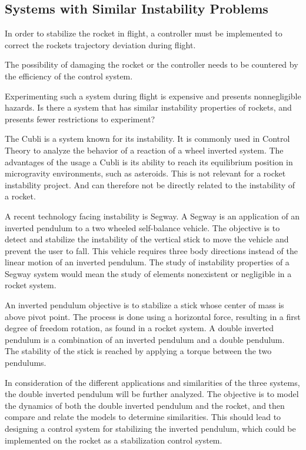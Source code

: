 \subsection{Systems with Similar Instability Problems}
\graphicspath{{figures/"Preanalysis&Requirement"/SimilarSystems/}}

In order to stabilize the rocket in flight, a controller must be implemented to correct the rockets trajectory deviation during flight.

The possibility of damaging the rocket or the controller needs to be countered by the efficiency of the control system.


Experimenting such a system during flight is expensive and presents nonnegligible hazards.
Is there a system that has similar instability properties of rockets, and presents fewer restrictions to experiment?

The Cubli is a system known for its instability. It is commonly used in Control Theory to analyze the behavior of a reaction of a wheel inverted system. The advantages of the usage a Cubli is its ability to reach its equilibrium position in microgravity environments, such as asteroids. This is not relevant for a rocket instability project. And can therefore not be directly related to the instability of a rocket.

A recent technology facing instability is Segway. A Segway is an application of an inverted pendulum to a two wheeled self-balance vehicle. The objective is to detect and stabilize the instability of the vertical stick to move the vehicle and prevent the user to fall. This vehicle requires three body directions instead of the linear motion of an inverted pendulum. The study of instability properties of a Segway system would mean the study of elements nonexistent or negligible in a rocket system.

An inverted pendulum objective is to stabilize a stick whose center of mass is above pivot point. The process is done using a horizontal force, resulting in a first degree of freedom rotation, as found in a rocket system. A double inverted pendulum is a combination of an inverted pendulum and a double pendulum. The stability of the stick is reached by applying a torque between the two pendulums.

In consideration of the different applications and similarities of the three systems, the double inverted pendulum will be further analyzed. The objective is to model the dynamics of both the double inverted pendulum and the rocket, and then compare and relate the models to determine similarities. This should lead to designing a control system for stabilizing the inverted pendulum, which could be implemented on the rocket as a stabilization control system. 



